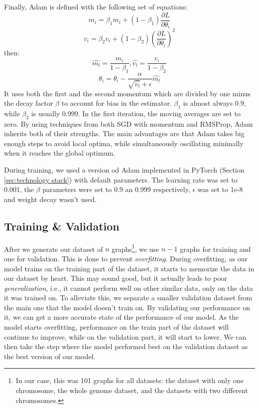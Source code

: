 \documentclass[times, utf8, diplomski, english]{fer_eng}
\begin{document}
Finally, Adam is defined with the following set of equations:
\[ m_i = \beta_1 m_i + (1 - \beta_1) \frac{\partial L}{\partial \theta_i} \]
\[ v_i = \beta_2 v_i + (1 - \beta_2) \left(\frac{\partial L}{\partial \theta_i}\right)^2 \]
then:
\[ \widehat{m_l} = \frac{m_i}{1 - \beta_1}, \widehat{v_l} = \frac{v_i}{1 - \beta_2} \]
\[ \theta_i = \theta_i - \frac{\alpha}{\sqrt{\widehat{v_l}} + \epsilon} \widehat{m_l} \]
It uses both the first and the second momentum which are divided by one minus the decay factor $\beta$ to account for bias in the estimator. $\beta_1$ is almost always 0.9, while $\beta_2$ is usually 0.999. In the first iteration, the moving averages are set to zero. By using techniques from both SGD with momentum and RMSProp, Adam inherits both of their strengths. The main advantages are that Adam takes big enough steps to avoid local optima, while simultaneously oscillating minimally when it reaches the global optimum.

During training, we used a version od Adam implemented in PyTorch (Section \ref{sec:technology stack}) with default parameters. The learning rate was set to 0.001, the $\beta$ parameters were set to 0.9 an 0.999 respectively, $\epsilon$ was set to 1e-8 and weight decay wasn't used.

\subsection{Training \& Validation}
\label{subsec:the training process}

After we generate our dataset of $n$ graphs\footnote{In our case, this was 101 graphs for all datasets: the dataset with only one chromosome, the whole genome dataset, and the datasets with two different chromosomes.}, we use $n - 1$ graphs for training and one for validation. This is done to prevent \textit{overfitting}. During overfitting, as our model trains on the training part of the dataset, it starts to memorize the data in our dataset by heart. This may sound good, but it actually leads to poor \textit{generalization}, i.e., it cannot perform well on other similar data, only on the data it was trained on. To alleviate this, we separate a smaller validation dataset from the main one that the model doesn't train on. By validating our performance on it, we can get a more accurate state of the performance of our model. As the model starts overfitting, performance on the train part of the dataset will continue to improve, while on the validation part, it will start to lower. We can then take the step where the model performed best on the validation dataset as the best version of our model.
\end{document}

